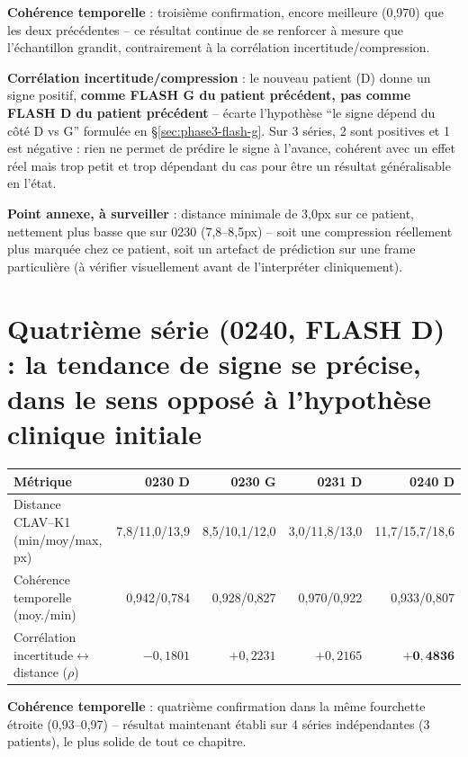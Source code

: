 \documentclass[11pt,a4paper]{report}
\begin{document}
\textbf{Cohérence temporelle} : troisième confirmation, encore meilleure (0,970)
que les deux précédentes -- ce résultat continue de se renforcer à mesure que
l'échantillon grandit, contrairement à la corrélation incertitude/compression.

\textbf{Corrélation incertitude/compression} : le nouveau patient (D) donne un
signe positif, \textbf{comme FLASH G du patient précédent, pas comme FLASH D du
patient précédent} -- écarte l'hypothèse ``le signe dépend du côté D vs G'' formulée
en \S\ref{sec:phase3-flash-g}. Sur 3 séries, 2 sont positives et 1 est négative :
rien ne permet de prédire le signe à l'avance, cohérent avec un effet réel mais trop
petit et trop dépendant du cas pour être un résultat généralisable en l'état.

\textbf{Point annexe, à surveiller} : distance minimale de 3,0px sur ce patient,
nettement plus basse que sur 0230 (7,8--8,5px) -- soit une compression réellement
plus marquée chez ce patient, soit un artefact de prédiction sur une frame
particulière (à vérifier visuellement avant de l'interpréter cliniquement).

\section{Quatrième série (0240, FLASH D) : la tendance de signe se précise, dans le
sens opposé à l'hypothèse clinique initiale}

\begin{center}
\begin{tabular}{lrrrr}
\toprule
Métrique & 0230 D & 0230 G & 0231 D & 0240 D \\
\midrule
Distance CLAV--K1 (min/moy/max, px) & 7,8/11,0/13,9 & 8,5/10,1/12,0 & 3,0/11,8/13,0 &
    11,7/15,7/18,6 \\
Cohérence temporelle (moy./min) & 0,942/0,784 & 0,928/0,827 & 0,970/0,922 &
    0,933/0,807 \\
Corrélation incertitude$\leftrightarrow$distance ($\rho$) & $-0{,}1801$ &
    $+0{,}2231$ & $+0{,}2165$ & $\mathbf{+0{,}4836}$ \\
\bottomrule
\end{tabular}
\end{center}

\textbf{Cohérence temporelle} : quatrième confirmation dans la même fourchette
étroite (0,93--0,97) -- résultat maintenant établi sur 4 séries indépendantes (3
patients), le plus solide de tout ce chapitre.
\end{document}
